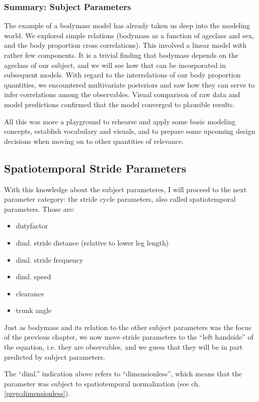 \subsubsection{Summary: Subject Parameters}
\label{sec:orge0c65f9}
The example of a bodymass model has already taken us deep into the modeling world.
We explored simple relations (bodymass as a function of ageclass and sex, and the body proportion cross correlations).
This involved a linear model with rather few components.
It is a trivial finding that bodymass depends on the ageclass of our subject, and we will see how that can be incorporated in subsequent models.
With regard to the interrelations of our body proportion quantities, we encountered multivariate posteriors and saw how they can serve to infer correlations among the observables.
Visual comparison of raw data and model predictions confirmed that the model converged to plausible results.

All this was more a playground to rehearse and apply some basic modeling concepts, establish vocabulary and visuals, and to prepare some upcoming design decisions when moving on to other quantities of relevance.

\clearpage
\subsection{Spatiotemporal Stride Parameters}
\label{sec:org69bec74}
With this knowledge about the subject parameteres, I will proceed to the next parameter category: the stride cycle parameters, also called spatiotemporal parameters. Those are:
\begin{itemize}
\item dutyfactor
\item diml. stride distance (relative to lower leg length)
\item diml. stride frequency
\item diml. speed
\item clearance
\item trunk angle
\end{itemize}

Just as bodymass and its relation to the other subject parameters was the focus of the previous chapter, we now move stride parameters to the ``left handside'' of the equation, i.e. they are observables, and we guess that they will be in part predicted by subject parameters.

The ``diml.'' indication above refers to ``dimensionless'', which means that the parameter was subject to spatiotemporal normalization (see ch. \ref{prep:dimensionless}).


